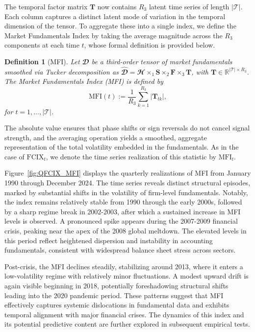 \documentclass[pdflatex,sn-mathphys-num]{sn-jnl}%
\theoremstyle{thmstyleone}%
\theoremstyle{thmstyletwo}%
\theoremstyle{thmstylethree}%
\newtheorem{definition}{Definition}%
\begin{document}
The temporal factor matrix $\mathbf{T}$ now contains $R_3$ latent time series of length $|\mathcal{T}|$. Each column captures a distinct latent mode of variation in the temporal dimension of the tensor. To aggregate these into a single index, we define the Market Fundamentals Index by taking the average magnitude across the $R_3$ components at each time $t$, whose formal definition is provided below.\newline

\begin{definition}[MFI]
	Let $\mathbfcal{D}$ be a third-order tensor of market fundamentals smoothed via Tucker decomposition as $\widehat{\mathbfcal{D}} = \mathbfcal{H} \times_1 \mathbf{S} \times_2 \mathbf{F} \times_3 \mathbf{T}$, with $\mathbf{T} \in \mathbb{R}^{|\mathcal{T}| \times R_3}$. The Market Fundamentals Index (MFI) is defined by
	\begin{equation}
		\mathrm{MFI}(t) := \frac{1}{R_3} \sum_{k=1}^{R_3} \left| \mathbf{T}_{t k} \right|,
	\end{equation}
	for $t = 1, \ldots, |\mathcal{T}|$.\newline
\end{definition}

The absolute value ensures that phase shifts or sign reversals do not cancel signal strength, and the averaging operation yields a smoothed, aggregate representation of the total volatility embedded in the fundamentals. As in the case of $\mathrm{FCIX}_t$, we denote the time series realization of this statistic by $\mathrm{MFI}_t$.

Figure~\ref{fig:QFCIX_MFI} displays the quarterly realizations of MFI from January 1990 through December 2024. The time series reveals distinct structural episodes, marked by substantial shifts in the volatility of firm-level fundamentals. Notably, the index remains relatively stable from 1990 through the early 2000s, followed by a sharp regime break in 2002-2003, after which a sustained increase in MFI levels is observed. A pronounced spike appears during the 2007-2009 financial crisis, peaking near the apex of the 2008 global meltdown. The elevated levels in this period reflect heightened dispersion and instability in accounting fundamentals, consistent with widespread balance sheet stress across sectors.

Post-crisis, the MFI declines steadily, stabilizing around 2013, where it enters a low-volatility regime with relatively minor fluctuations. A modest upward drift is again visible beginning in 2018, potentially foreshadowing structural shifts leading into the 2020 pandemic period. These patterns suggest that MFI effectively captures systemic dislocations in fundamental data and exhibits temporal alignment with major financial crises. The dynamics of this index and its potential predictive content are further explored in subsequent empirical tests.
\end{document}

